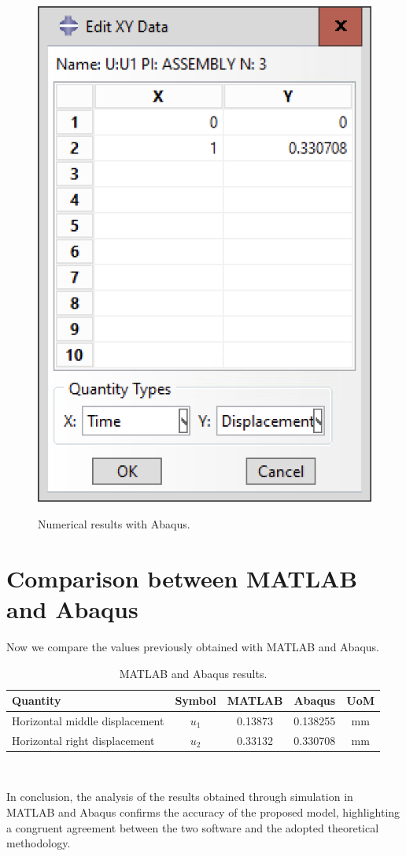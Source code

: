 \begin{figure}[H]
{        \includegraphics[scale=0.4]{Images/ab1/a32.png}
    }    
    \caption{Numerical results with Abaqus.}
    \label{fig:a303132}
\end{figure}

\section{Comparison between MATLAB and Abaqus}
\label{sec:comparison1}%

Now we compare the values previously obtained with MATLAB and Abaqus.

\begin{table}[H]
    \centering 
    \begin{tabular}{lcccc}
    \hline
    \rowcolor{bluepoli!40} %
    Quantity & Symbol & MATLAB & Abaqus & UoM \\
    \hline
    Horizontal middle displacement & $u_1$ & 0.13873 & 0.138255 & mm \\
    Horizontal right displacement & $u_2$ & 0.33132 & 0.330708 & mm \\
    \hline
    \end{tabular}
    \\[10pt]
    \caption{MATLAB and Abaqus results.}
    \label{table:alpha_beta}
\end{table}

In conclusion, the analysis of the results obtained through simulation in MATLAB and Abaqus confirms the accuracy of the proposed model, highlighting a congruent agreement between the two software and the adopted theoretical methodology.